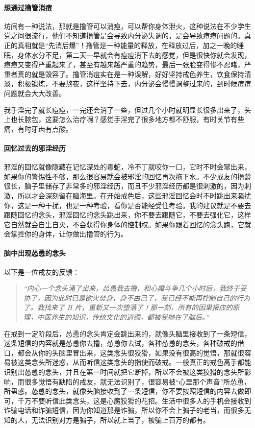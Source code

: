 \paragraph{想通过撸管消痘} 坊间有一种说法，那就是撸管可以消痘，可以帮你身体泄火，这种说法在不少学生党之间很流行，他们不知道撸管是会导致内分泌失调的，是会导致痘痘问题的。真正的真相就是“先消后爆”！撸管是一种能量的释放，在释放过后，加之一晚的睡眠，身体水分不足，第二天一早就会有痘痘消下去的感觉，但是很快你就会发现，痘痘又变得严重起来了，甚至有越来越严重的趋势，最后一张脸变得惨不忍睹，严重者真的就是毁容了。撸管消痘实在是一种误解，好好坚持戒色养生，饮食保持清淡，积极锻炼，不要熬夜，这样坚持下去，内分泌会慢慢调整过来的，到时候痘痘问题就会大大改善。

\begin{case}
    我手淫完了就长痘痘，一完还会消了一些，但过几个小时就明显长很多出来了，头上也长脓包，这要怎么治疗啊？感觉手淫完了很多地方都不舒服，有时关节有些痛，有时牙齿有点酸。
\end{case}

\paragraph{回忆过去的邪淫经历} 邪淫的回忆就像隐藏在记忆深处的毒蛇，冷不丁就咬你一口，它时不时会窜出来，如果你的警惕性不够，那么很容易就会被邪淫的回忆再次拖下水。不少戒友的撸龄很长，脑子里储存了非常多的邪淫经历，而且不少邪淫经历都是很刺激的，因为刺激，所以才会深刻留在脑海里。在开始戒色后，这些邪淫回忆会时不时跳出来骚扰你，这是一种干扰，也是一种考验，看你是否能经受住考验。我的建议就是不要去跟随回忆的念头，邪淫回忆的念头跳出来，你不要去跟随它，不要去强化它，这样它自然就会自生自灭，不会获得你身体的控制权。如果你跟着回忆的念头跑，它就会掌控你的身体，让你做出撸管的行为。

\paragraph{脑中出现怂恿的念头}

以下是一位戒友的反馈：

\begin{quote}\it
    “内心一个念头涌了出来，怂恿我去撸，和心魔斗争几个小时后，我终于妥协了，因为此时已是欲火焚身，身不由己了，我已经不能再控制自己的行为了。我找来了 H 片，重新又一次堕落了！那一刻，所有的因果报应的原理，中医养生的知识，传统文化的道德，都被我抛在了脑后。”
\end{quote}

在戒到一定阶段后，怂恿的念头肯定会跳出来的，就像头脑里接收到了一条短信，这条短信的内容就是怂恿你去撸，怂恿你去试，各种怂恿的念头，各种破戒的借口，都会从你的头脑里冒出来，这类念头很狡猾，如果没有很高的觉悟，那就很容易被这类念头所迷惑，从而听信这类念头的指使而破戒。一般真正的戒色高手都能识别出怂恿的念头，并且在第一时间就把它断掉，所以不会被这类狡猾的念头所影响，而很多觉悟有缺陷的戒友，就无法识别了，很容易被“心里那个声音”所怂恿，所蛊惑。怂恿的念头，就像头脑接收到了一条短信，你不要按照短信的内容去做即可，千万不要听信此类念头，这是心魔狡猾的花招。生活中很多人的手机会接收到诈骗电话和诈骗短信，因为你知道那是诈骗，所以你不会上骗子的老当，而很多无知的人，无法识别对方是骗子，所以就上当了，被骗上百万的都有。

